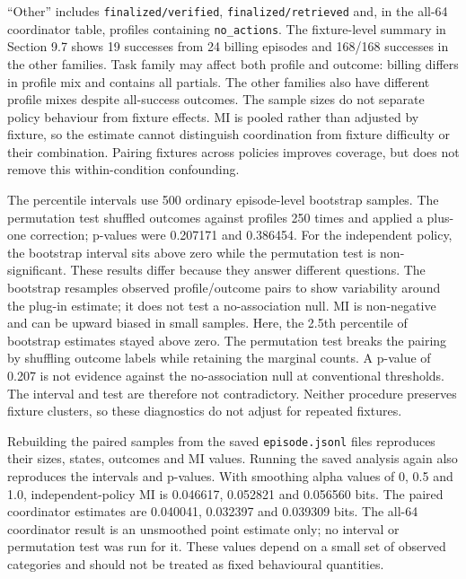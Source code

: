 \documentclass[12pt,a4paper,oneside]{report}
\begin{document}
“Other” includes \texttt{finalized/verified}, \texttt{finalized/retrieved} and, in the all-64 coordinator table, profiles containing \texttt{no\allowbreak\_actions}. The fixture-level summary in Section 9.7 shows 19 successes from 24 billing episodes and 168/168 successes in the other families. Task family may affect both profile and outcome: billing differs in profile mix and contains all partials. The other families also have different profile mixes despite all-success outcomes. The sample sizes do not separate policy behaviour from fixture effects. MI is pooled rather than adjusted by fixture, so the estimate cannot distinguish coordination from fixture difficulty or their combination. Pairing fixtures across policies improves coverage, but does not remove this within-condition confounding.

The percentile intervals use 500 ordinary episode-level bootstrap samples. The permutation test shuffled outcomes against profiles 250 times and applied a plus-one correction; p-values were 0.207171 and 0.386454. For the independent policy, the bootstrap interval sits above zero while the permutation test is non-significant. These results differ because they answer different questions. The bootstrap resamples observed profile/outcome pairs to show variability around the plug-in estimate; it does not test a no-association null. MI is non-negative and can be upward biased in small samples. Here, the 2.5th percentile of bootstrap estimates stayed above zero. The permutation test breaks the pairing by shuffling outcome labels while retaining the marginal counts. A p-value of 0.207 is not evidence against the no-association null at conventional thresholds. The interval and test are therefore not contradictory. Neither procedure preserves fixture clusters, so these diagnostics do not adjust for repeated fixtures.

Rebuilding the paired samples from the saved \texttt{episode.jsonl} files reproduces their sizes, states, outcomes and MI values. Running the saved analysis again also reproduces the intervals and p-values. With smoothing alpha values of 0, 0.5 and 1.0, independent-policy MI is 0.046617, 0.052821 and 0.056560 bits. The paired coordinator estimates are 0.040041, 0.032397 and 0.039309 bits. The all-64 coordinator result is an unsmoothed point estimate only; no interval or permutation test was run for it. These values depend on a small set of observed categories and should not be treated as fixed behavioural quantities.
\end{document}
